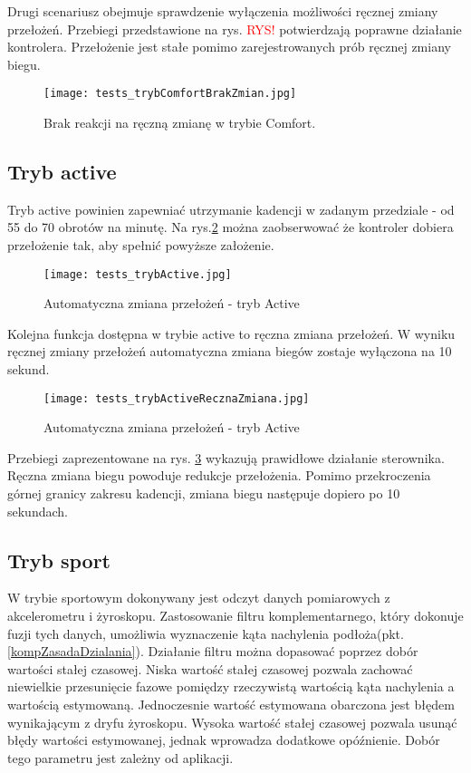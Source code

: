 Drugi scenariusz obejmuje sprawdzenie wyłączenia możliwości ręcznej zmiany przełożeń. Przebiegi przedstawione na rys. \textcolor{red}{RYS!} potwierdzają poprawne działanie kontrolera. Przełożenie jest stałe pomimo zarejestrowanych prób ręcznej zmiany biegu.
\begin{figure}[h]
    \centering
    \texttt{[image: tests\_trybComfortBrakZmian.jpg]}
    \caption{Brak reakcji na ręczną zmianę w trybie Comfort.}
    \label{fig:tests_noChange}
\end{figure}

\subsection{Tryb active}

Tryb active powinien zapewniać utrzymanie kadencji w zadanym przedziale - od 55 do 70 obrotów na minutę. Na rys.\ref{fig:tests_active} można zaobserwować że kontroler dobiera  przełożenie tak, aby spełnić powyższe założenie.
\begin{figure}[h]
    \centering
    \texttt{[image: tests\_trybActive.jpg]}
    \caption{Automatyczna zmiana przełożeń - tryb Active}
    \label{fig:tests_active}
\end{figure}

Kolejna funkcja dostępna w trybie active to ręczna zmiana przełożeń. W wyniku ręcznej zmiany przełożeń automatyczna zmiana biegów zostaje wyłączona na 10 sekund. 
\begin{figure}[h]
    \centering
    \texttt{[image: tests\_trybActiveRecznaZmiana.jpg]}
    \caption{Automatyczna zmiana przełożeń - tryb Active}
    \label{fig:tests_activeReczna}
\end{figure}

Przebiegi zaprezentowane na rys. \ref{fig:tests_activeReczna} wykazują prawidłowe działanie sterownika. Ręczna zmiana biegu powoduje redukcje przełożenia. Pomimo przekroczenia górnej granicy zakresu kadencji, zmiana biegu następuje dopiero po 10 sekundach.

\subsection{Tryb sport}
W trybie sportowym dokonywany jest odczyt danych pomiarowych z akcelerometru i żyroskopu. Zastosowanie filtru komplementarnego, który dokonuje fuzji tych danych, umożliwia wyznaczenie kąta nachylenia podłoża(pkt.\ref{kompZasadaDzialania}). Działanie filtru można dopasować poprzez dobór wartości stałej czasowej. Niska wartość stałej czasowej pozwala zachować niewielkie przesunięcie fazowe pomiędzy rzeczywistą wartością kąta nachylenia a wartością estymowaną. Jednoczesnie wartość estymowana obarczona jest błędem wynikającym z dryfu żyroskopu. Wysoka wartość stałej czasowej pozwala usunąć błędy wartości estymowanej, jednak wprowadza dodatkowe opóźnienie. Dobór tego parametru jest zależny od aplikacji.

